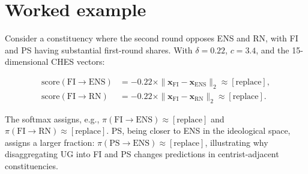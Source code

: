\documentclass[10pt, a4paper]{article}
\begin{document}
\section{Worked example}
\label{app:example}

Consider a constituency where the second round opposes ENS and RN, with FI
and PS having substantial first-round shares.
With $\delta = 0.22$, $c = 3.4$, and the 15-dimensional CHES vectors:

\begin{align*}
  \mathrm{score}(\mathrm{FI} \to \mathrm{ENS})
    &= -0.22 \times \|\mathbf{x}_\mathrm{FI} - \mathbf{x}_\mathrm{ENS}\|_2
    \approx [\text{replace}], \\
  \mathrm{score}(\mathrm{FI} \to \mathrm{RN})
    &= -0.22 \times \|\mathbf{x}_\mathrm{FI} - \mathbf{x}_\mathrm{RN}\|_2
    \approx [\text{replace}].
\end{align*}

The softmax assigns, e.g.,
$\pi(\mathrm{FI} \to \mathrm{ENS}) \approx [\text{replace}]$ and
$\pi(\mathrm{FI} \to \mathrm{RN}) \approx [\text{replace}]$.
PS, being closer to ENS in the ideological space, assigns a larger fraction:
$\pi(\mathrm{PS} \to \mathrm{ENS}) \approx [\text{replace}]$, illustrating
why disaggregating UG into FI and PS changes predictions in centrist-adjacent
constituencies.
\end{document}
